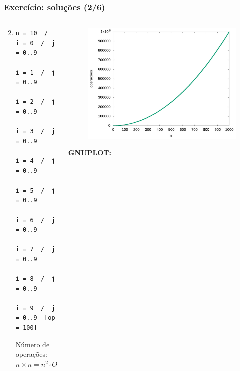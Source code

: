 \documentclass[aspectratio=169]{beamer}
\begin{document}
\begin{frame}[fragile]\frametitle{Exercício: soluções (2/6)}
\begin{columns}[T]
\begin{column}{0.5\linewidth}
\begin{enumerate}
	\setcounter{enumi}{1}
	\item {\scriptsize}
{\tiny
\begin{verbatim}
n = 10  /  i = 0  /  j = 0..9
           i = 1  /  j = 0..9
           i = 2  /  j = 0..9
           i = 3  /  j = 0..9
           i = 4  /  j = 0..9
           i = 5  /  j = 0..9
           i = 6  /  j = 0..9
           i = 7  /  j = 0..9
           i = 8  /  j = 0..9
           i = 9  /  j = 0..9  [op = 100]
\end{verbatim}
Número de operações: $n \times n = n^{2} \therefore O(n^2)$
}
\end{enumerate}
\end{column}
\begin{column}{0.5\linewidth}
\begin{figure}[h]
	\centering
	\includegraphics[height=0.5\paperheight]{contagem/contagem02.jpg}
\end{figure}
{\fontsize{0}{4}\selectfont{}\textbf{GNUPLOT:}

}
\end{column}
\end{columns}
\end{frame}
\end{document}
